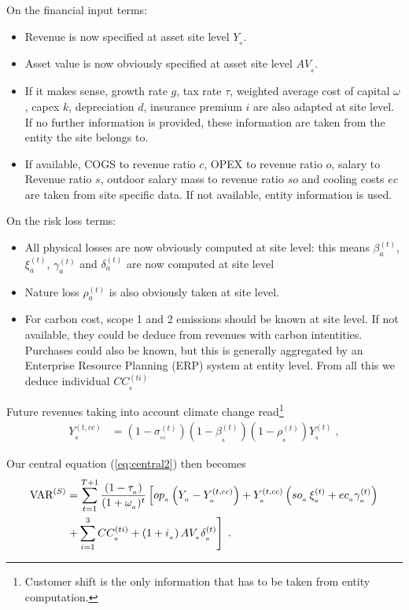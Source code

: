 On the financial input terms:
\begin{itemize}
\item[•] Revenue is now specified at asset site level $Y_{_{a}}$.
\item[•] Asset value is now obviously specified at asset site level $AV_{_{a}}$.
\item[•] If it makes sense, growth rate $g$, tax rate $\tau$, weighted average cost of capital $\omega$, capex $k$, depreciation $d$, insurance premium $i$ are also adapted at site level. If no further information is provided, these information are taken from the entity the site belongs to.
\item[•] If available, COGS to revenue ratio $c$, OPEX to revenue ratio $o$, salary to Revenue ratio $s$, outdoor salary mass to revenue ratio $so$ and cooling costs $ec$ are taken from site specific data. If not available, entity information is used.
\end{itemize}
On the risk loss terms:
\begin{itemize}
\item[•] All physical losses are now obviously computed at site level: this means $\beta^{(t)}_{a}$,  $\xi^{(t)}_{a}$, $\gamma^{(t)}_{a}$ and $\delta^{(t)}_{a}$ are now computed at site level
\item[•] Nature loss $\rho^{(t)}_{a}$ is also obviously taken at site level.
\item[•] For carbon cost, scope 1 and 2 emissions should be known at site level. If not available, they could be deduce from revenues with carbon intentities. Purchases could also be known, but this is generally aggregated by an Enterprise Resource Planning (ERP) system at entity level. From all this we deduce individual $CC^{(ti)}_{_{a}}$
\end{itemize}
Future revenues taking into account climate change read\footnote{Customer shift is the only information that has to be taken from entity computation.}
\begin{align}
Y^{(t,cc)}_{_{a}}&=\left(1-\sigma^{(t)}_{_{cs}}\right)\left(1-\beta^{(t)}_{_{a}}\right)
%
\left(1-\rho^{(t)}_{_{a}}\right)Y^{(t)}_{_{a}}\;,
\end{align}

Our central equation (\ref{eq:central2}) then becomes
\begin{align}
\text{VAR}^{(S)}&=
%
\sum_{t=1}^{T+1}
%
\frac{\left( 1-\tau_{_{a}}\right)}{(1+\omega_{_{a}})^t}
%
\left[op_{_{a}}\left(Y_{_{a}}-Y^{(t,cc)}_{_{a}}\right)
%
+Y^{(t,cc)}_{_{a}}\left(so_{_{a}}\, \xi^{(t)}_{_{a}} + ec_{_{a}} \gamma^{(t)}_{_{a}}\right)
%
\right.\notag\\
%
&\left. +\sum_{i=1}^3CC^{(ti)}_{_{a}}+\left(1+i_{_{a}}\right) AV_{_{a}} \delta^{(t)}_{_{a}}
%
\right]\;.\label{eq:centralsite}
\end{align}


